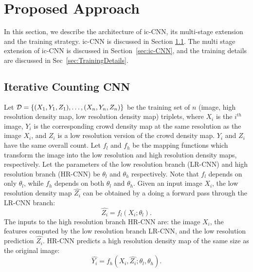\documentclass[runningheads]{llncs}
\begin{document}
\section{Proposed Approach}
In this section, we describe the architecture of ic-CNN, its multi-stage extension
and the training strategy.
ic-CNN is discussed in Section \ref{sec:BasicCountingBlock}. 
The multi stage extension of ic-CNN is discussed in Section~\ref{sec:ic-CNN}, and the training details are discussed in Sec~\ref{sec:TrainingDetails}.

 
\subsection{Iterative Counting CNN}\label{sec:BasicCountingBlock}

Let $\mathcal{D} = \{(X_1,Y_1,Z_1),\dotsc,(X_n,Y_n,Z_n)\}$ be the training set of $n$ (image, high resolution density map, low resolution density map) triplets, where $X_i$ is the $i^{th}$ image, $Y_i$ is the corresponding crowd density map at the same resolution as the image $X_i$, and $Z_i$ is a low resolution version of the crowd density map. $Y_i$ and $Z_i$ have the same overall count. Let $f_l$ and $f_h$ be the mapping functions which transform the image into the low resolution and high resolution density maps, respectively. Let the parameters of the low resolution branch (LR-CNN) and high resolution branch (HR-CNN) be $\theta_l$ and $\theta_h$ respectively. Note that $f_l$ depends on only $\theta_l$, while $f_h$ depends on both $\theta_l$ and $\theta_h$. Given an input image $X_i$, the low resolution density map $\hat{Z_i}$ can be obtained by a doing a forward pass through the LR-CNN branch:
\begin{equation}\label{eqn:op1}
\hat{Z_i}= f_l(X_i;\theta_l). 
\end{equation}
The inputs to the high resolution branch HR-CNN are: the image $X_i$, the features computed by the low resolution branch LR-CNN, and the low resolution prediction $\hat{Z_i}$. HR-CNN predicts a high resolution density map of the same size as the original image:
\begin{equation}\label{eqn:op2}
\hat{Y_i}= f_h(X_i,\hat{Z_i};\theta_l, \theta_h). 
\end{equation}
\end{document}
